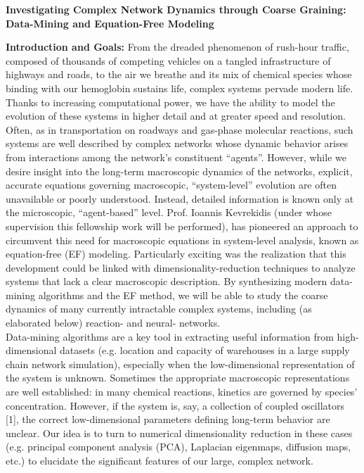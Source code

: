 \documentclass[11pt]{article}
\begin{document}
\noindent \textbf{Investigating Complex Network Dynamics through Coarse Graining: Data-Mining and Equation-Free Modeling}

\textbf{Introduction and Goals:} From the dreaded phenomenon of rush-hour traffic, composed of thousands of competing vehicles on a tangled infrastructure of highways and roads, to the air we breathe and its mix of chemical species whose binding with our hemoglobin sustains life, complex systems pervade modern life. Thanks to increasing computational power, we have the ability to model the evolution of these systems in higher detail and at greater speed and resolution. Often, as in transportation on roadways and gas-phase molecular reactions, such systems are well described by complex networks whose dynamic behavior arises from interactions among the network's constituent ``agents''. However, while we desire insight into the long-term macroscopic dynamics of the networks, explicit, accurate equations governing macroscopic, “system-level” evolution are often unavailable or poorly understood. Instead, detailed information is known only at the microscopic, ``agent-based'' level. Prof. Ioannis Kevrekidis (under whose supervision this fellowship work will be performed), has pioneered an approach to circumvent this need for macroscopic equations in system-level analysis, known as equation-free (EF) modeling. Particularly exciting was the realization that this development could be linked with dimensionality-reduction techniques to analyze systems that lack a clear macroscopic description. By synthesizing modern data-mining algorithms and the EF method, we will be able to study the coarse dynamics of many currently intractable complex systems, including (as elaborated below) reaction- and neural- networks.\\
\indent Data-mining algorithms are a key tool in extracting useful information from high-dimensional datasets (e.g. location and capacity of warehouses in a large supply chain network simulation), especially when the low-dimensional representation of the system is unknown. Sometimes the appropriate macroscopic representations are well established: in many chemical reactions, kinetics are governed by species' concentration. However, if the system is, say, a collection of coupled oscillators [1], the correct low-dimensional parameters defining long-term behavior are unclear. Our idea is to turn to numerical dimensionality reduction in these cases (e.g. principal component analysis (PCA), Laplacian eigenmaps, diffusion maps, etc.) to elucidate the significant features of our large, complex network.\\
\end{document}
